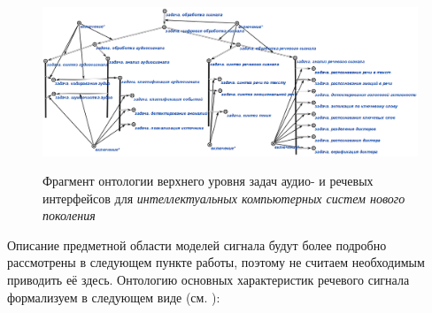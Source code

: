 \begin{figure}[H]
    \caption{Фрагмент онтологии верхнего уровня задач аудио- и речевых интерфейсов для \textit{интеллектуальных компьютерных систем нового поколения}}
    \includegraphics[scale=1.0, width=1.0\textwidth]{author/part4/figures/ch43_fig04_audio-and-speech-tasks-formalization-ru.png}
    \label{fig:audio-and-speech-tasks-formalization-ru}
\end{figure}

Описание предметной области моделей сигнала будут более подробно рассмотрены в следующем пункте работы, поэтому не считаем необходимым приводить её здесь.
Онтологию основных характеристик речевого сигнала формализуем в следующем виде (см. ):

